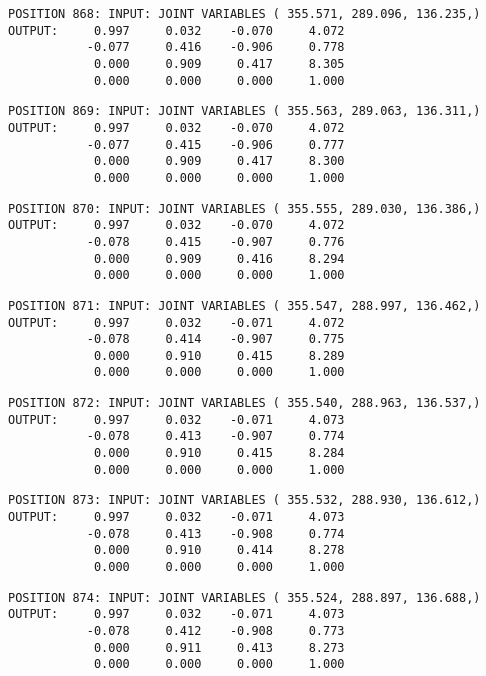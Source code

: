 \begin{verbatim}
POSITION 868: INPUT: JOINT VARIABLES ( 355.571, 289.096, 136.235,)
OUTPUT:     0.997     0.032    -0.070     4.072
           -0.077     0.416    -0.906     0.778
            0.000     0.909     0.417     8.305
            0.000     0.000     0.000     1.000
\end{verbatim} \pagebreak[1]\begin{verbatim}
POSITION 869: INPUT: JOINT VARIABLES ( 355.563, 289.063, 136.311,)
OUTPUT:     0.997     0.032    -0.070     4.072
           -0.077     0.415    -0.906     0.777
            0.000     0.909     0.417     8.300
            0.000     0.000     0.000     1.000
\end{verbatim} \pagebreak[1]\begin{verbatim}
POSITION 870: INPUT: JOINT VARIABLES ( 355.555, 289.030, 136.386,)
OUTPUT:     0.997     0.032    -0.070     4.072
           -0.078     0.415    -0.907     0.776
            0.000     0.909     0.416     8.294
            0.000     0.000     0.000     1.000
\end{verbatim} \pagebreak[1]\begin{verbatim}
POSITION 871: INPUT: JOINT VARIABLES ( 355.547, 288.997, 136.462,)
OUTPUT:     0.997     0.032    -0.071     4.072
           -0.078     0.414    -0.907     0.775
            0.000     0.910     0.415     8.289
            0.000     0.000     0.000     1.000
\end{verbatim} \pagebreak[1]\begin{verbatim}
POSITION 872: INPUT: JOINT VARIABLES ( 355.540, 288.963, 136.537,)
OUTPUT:     0.997     0.032    -0.071     4.073
           -0.078     0.413    -0.907     0.774
            0.000     0.910     0.415     8.284
            0.000     0.000     0.000     1.000
\end{verbatim} \pagebreak[1]\begin{verbatim}
POSITION 873: INPUT: JOINT VARIABLES ( 355.532, 288.930, 136.612,)
OUTPUT:     0.997     0.032    -0.071     4.073
           -0.078     0.413    -0.908     0.774
            0.000     0.910     0.414     8.278
            0.000     0.000     0.000     1.000
\end{verbatim} \pagebreak[1]\begin{verbatim}
POSITION 874: INPUT: JOINT VARIABLES ( 355.524, 288.897, 136.688,)
OUTPUT:     0.997     0.032    -0.071     4.073
           -0.078     0.412    -0.908     0.773
            0.000     0.911     0.413     8.273
            0.000     0.000     0.000     1.000
\end{verbatim} \pagebreak[1]\begin{verbatim}

\end{verbatim}
